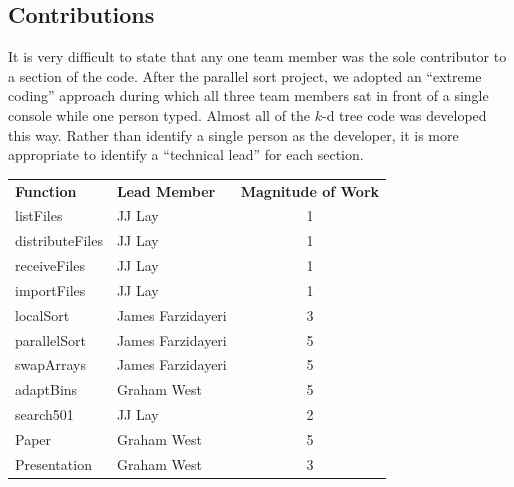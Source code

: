 \documentclass{article}
\begin{document}
\subsection{Contributions}

It is very difficult to state that any one team member was the sole contributor to a section of the code. After the parallel sort project, we adopted an ``extreme coding'' approach during which all three team members sat in front of a single console while one person typed. Almost all of the $k$-d tree code was developed this way. Rather than identify a single person as the developer, it is more appropriate to identify a ``technical lead'' for each section.

\begin{tabular}{l l c}
\textbf{Function}  & \textbf{Lead Member} & \textbf{Magnitude of Work} \\
listFiles & JJ Lay & 1 \\
distributeFiles & JJ Lay & 1 \\
receiveFiles & JJ Lay & 1 \\
importFiles & JJ Lay & 1 \\
localSort & James Farzidayeri & 3 \\
parallelSort & James Farzidayeri & 5 \\
swapArrays & James Farzidayeri & 5 \\
adaptBins & Graham West & 5 \\
search501 & JJ Lay & 2 \\
Paper & Graham West & 5 \\
Presentation & Graham West & 3 \\
\end{tabular}

\end{document}
